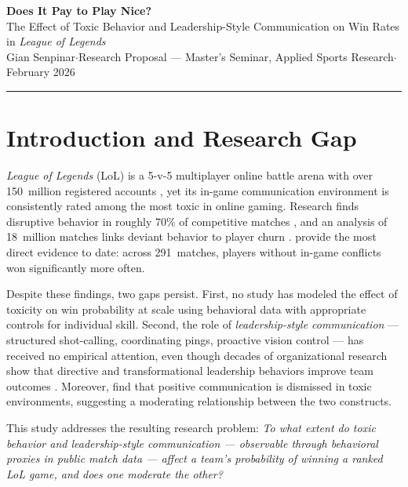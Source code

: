 \documentclass[11pt, a4paper]{article}
\begin{document}

\begin{center}
{\large\bfseries Does It Pay to Play Nice?}\\[2pt]
{\normalsize The Effect of Toxic Behavior and Leadership-Style Communication
on Win Rates in \textit{League of Legends}}\\[4pt]
{\small Gian Senpinar\quad$\cdot$\quad Research Proposal — Master's Seminar,
Applied Sports Research\quad$\cdot$\quad February 2026}
\end{center}

\vspace{4pt}
\hrule
\vspace{6pt}

\section{Introduction and Research Gap}

\textit{League of Legends} (LoL) is a 5-v-5 multiplayer online battle arena with over
150~million registered accounts \parencite{riotgames2016}, yet its in-game
communication environment is consistently rated among the most toxic in online
gaming. Research finds disruptive behavior in roughly 70\% of competitive matches
\parencite{martinezdeavila2023}, and an analysis of 18~million matches links deviant
behavior to player churn \parencite{kwak2015}. \textcite{achterbosch2021} provide the
most direct evidence to date: across 291~matches, players without in-game conflicts
won significantly more often.

Despite these findings, two gaps persist. First, no study has modeled the effect of
toxicity on win probability at scale using behavioral data with appropriate controls
for individual skill. Second, the role of \textit{leadership-style communication} —
structured shot-calling, coordinating pings, proactive vision control — has received
no empirical attention, even though decades of organizational research show that
directive and transformational leadership behaviors improve team outcomes
\parencite{bass1985, dedreu2003}. Moreover, \textcite{sarcasm2023} find that positive
communication is dismissed in toxic environments, suggesting a moderating
relationship between the two constructs.

This study addresses the resulting research problem: \textit{To what extent do toxic
behavior and leadership-style communication — observable through behavioral
proxies in public match data — affect a team's probability of winning a ranked LoL
game, and does one moderate the other?}
\end{document}
